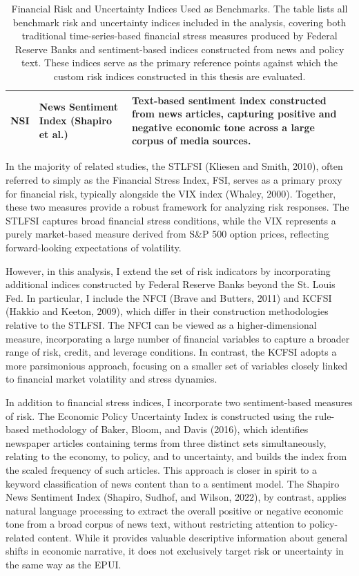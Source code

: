 \documentclass[12pt,a4paper]{report}\usepackage[a4paper, top=2.5cm, bottom=2.5cm, left=2.5cm, right=2.5cm]{geometry}
\begin{document}
\begin{table}[H]
\begin{tabularx}{\textwidth}{p{2.5cm} p{6.5cm} X}
NSI & News Sentiment Index (Shapiro et al.) 
& Text-based sentiment index constructed from news articles, capturing positive and negative economic tone across a large corpus of media sources. \\

\hline
\end{tabularx}
\caption{Financial Risk and Uncertainty Indices Used as Benchmarks. The table lists all benchmark risk and uncertainty indices included in the analysis, covering both traditional time-series-based financial stress measures produced by Federal Reserve Banks and sentiment-based indices constructed from news and policy text. These indices serve as the primary reference points against which the custom risk indices constructed in this thesis are evaluated.}

\end{table} 


In the majority of related studies, the STLFSI (Kliesen and Smith, 2010), often referred to 
simply as the Financial Stress Index, FSI, serves as a primary proxy for financial risk, 
typically alongside the VIX index (Whaley, 2000). Together, these two measures provide a 
robust framework for analyzing risk responses. The STLFSI captures broad financial stress 
conditions, while the VIX represents a purely market-based measure derived from S\&P 500 
option prices, reflecting forward-looking expectations of volatility.

However, in this analysis, I extend the set of risk indicators by incorporating additional 
indices constructed by Federal Reserve Banks beyond the St. Louis Fed. In particular, I 
include the NFCI (Brave and Butters, 2011) and KCFSI (Hakkio and Keeton, 2009), which 
differ in their construction methodologies relative to the STLFSI. The NFCI can be viewed 
as a higher-dimensional measure, incorporating a large number of financial variables to 
capture a broader range of risk, credit, and leverage conditions. In contrast, the KCFSI 
adopts a more parsimonious approach, focusing on a smaller set of variables closely linked 
to financial market volatility and stress dynamics.

In addition to financial stress indices, I incorporate two sentiment-based measures of risk. 
The Economic Policy Uncertainty Index is constructed using the rule-based methodology of 
Baker, Bloom, and Davis (2016), which identifies newspaper articles containing terms from 
three distinct sets simultaneously, relating to the economy, to policy, and to uncertainty, 
and builds the index from the scaled frequency of such articles. This approach is closer in 
spirit to a keyword classification of news content than to a sentiment model. The Shapiro 
News Sentiment Index (Shapiro, Sudhof, and Wilson, 2022), by contrast, applies natural 
language processing to extract the overall positive or negative economic tone from a broad 
corpus of news text, without restricting attention to policy-related content. While it 
provides valuable descriptive information about general shifts in economic narrative, it does 
not exclusively target risk or uncertainty in the same way as the EPUI.
\end{document}
